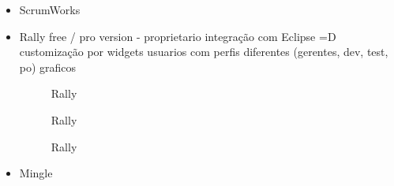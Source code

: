 \begin{itemize}
\item ScrumWorks

\item Rally
free / pro version - proprietario
integração com Eclipse =D
customização por widgets
usuarios com perfis diferentes (gerentes, dev, test, po)
graficos

\begin{figure}[H]
  \centering
  \caption{Rally}
\end{figure}

\begin{figure}[H]
  \centering
  \caption{Rally}
\end{figure}

\begin{figure}[H]
  \centering
  \caption{Rally}
\end{figure}

\item Mingle

\end{itemize}

